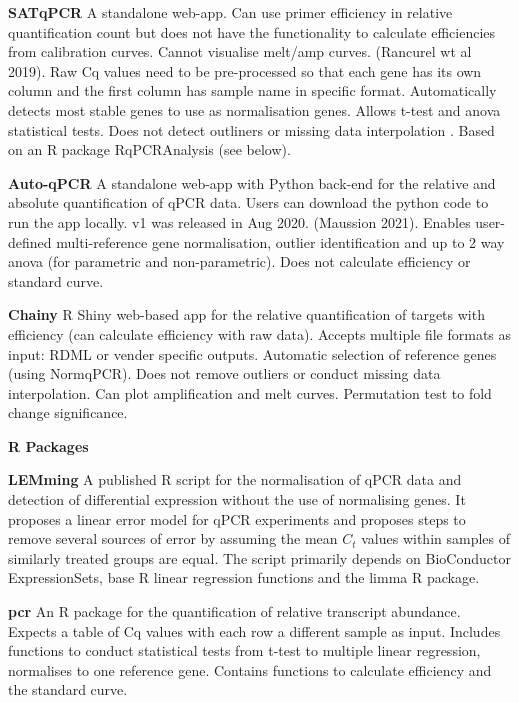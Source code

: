 \documentclass{SBCbookchapter}
\begin{document}
\textbf{SATqPCR} A standalone web-app. Can use primer efficiency in relative quantification count but does not have the functionality to calculate efficiencies from calibration curves. Cannot visualise melt/amp curves. (Rancurel wt al 2019). Raw Cq values need to be pre-processed so that each gene has its own column and the first column has sample name in specific format. Automatically detects most stable genes to use as normalisation genes. Allows t-test and anova statistical tests. Does not detect outliners or missing data interpolation \cite{Rancurel2019}. Based on an R package RqPCRAnalysis (see below).

\textbf{Auto-qPCR} A standalone web-app with Python back-end for the relative and absolute quantification of qPCR data. Users can download the python code to run the app locally. v1 was released in Aug 2020. (Maussion 2021). Enables user-defined multi-reference gene normalisation, outlier identification and up to 2 way anova (for parametric and non-parametric). Does not calculate efficiency or standard curve. \cite{Maussion2021}

\textbf{Chainy} R Shiny web-based app for the relative quantification of targets with efficiency (can calculate efficiency with raw data). Accepts multiple file formats as input: RDML or vender specific outputs. Automatic selection of reference genes (using NormqPCR). Does not remove outliers or conduct missing data interpolation. Can plot amplification and melt curves. Permutation test to fold change significance. \cite{Mallona2017}

\textbf{R Packages}

\textbf{LEMming} A published R script for the normalisation of qPCR data and detection of differential expression without the use of normalising genes. It proposes a linear error model for qPCR experiments and proposes steps to remove several sources of error by assuming the mean $C_t$ values within samples of similarly treated groups are equal. The script primarily depends on BioConductor ExpressionSets, base R linear regression functions and the limma R package. \cite{Feuer2015}

\textbf{pcr} An R package for the quantification of relative transcript abundance. Expects a table of Cq values with each row a different sample as input. Includes functions to conduct statistical tests from t-test to multiple linear regression, normalises to one reference gene. Contains functions to calculate efficiency and the standard curve. \cite{Ahmed2018}
\end{document}
